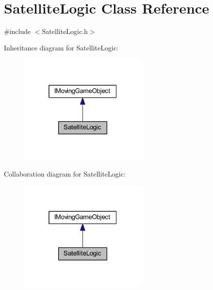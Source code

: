 \hypertarget{class_satellite_logic}{}\section{Satellite\+Logic Class Reference}
\label{class_satellite_logic}


{\ttfamily \#include $<$Satellite\+Logic.\+h$>$}



Inheritance diagram for Satellite\+Logic\+:\nopagebreak
\begin{figure}[H]
\begin{center}
\leavevmode
\includegraphics[width=184pt]{class_satellite_logic__inherit__graph}
\end{center}
\end{figure}


Collaboration diagram for Satellite\+Logic\+:\nopagebreak
\begin{figure}[H]
\begin{center}
\leavevmode
\includegraphics[width=184pt]{class_satellite_logic__coll__graph}
\end{center}
\end{figure}
